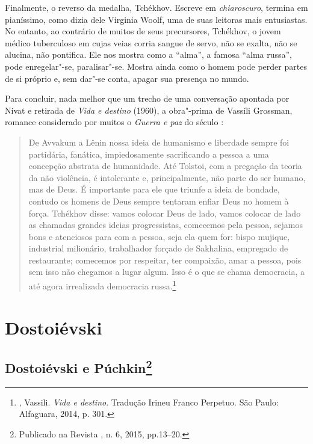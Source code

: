 Finalmente, o reverso da medalha, Tchékhov. Escreve em \emph{chiaroscuro}, termina em pianíssimo, como dizia dele Virginia
Woolf, uma de suas leitoras mais entusiastas. No entanto, ao contrário de muitos de seus precursores, Tchékhov, o jovem médico tuberculoso em cujas veias corria sangue de servo, não se exalta, não se alucina, não pontifica. Ele nos mostra como a ``alma'', a famosa ``alma russa'', pode enregelar"-se, paralisar"-se. Mostra ainda como o homem pode perder partes de si próprio e, sem dar"-se conta, apagar sua presença no mundo.

Para concluir, nada melhor que um trecho de uma conversação apontada por Nivat e retirada de \emph{Vida e destino} (1960), a obra"-prima de Vassíli Grossman, romance considerado por muitos o \emph{Guerra e paz} do século :

\begin{quotation}
De Avvakum a Lênin nossa ideia de humanismo e liberdade sempre foi partidária, fanática, impiedosamente sacrificando a pessoa a uma concepção abstrata de humanidade. Até Tolstoi, com a pregação da teoria da não violência, é intolerante e, principalmente, não parte do ser humano, mas de Deus. É importante para ele que triunfe a ideia de bondade, contudo os homens de Deus sempre tentaram enfiar Deus no homem à força. Tchékhov disse: vamos colocar Deus de lado, vamos colocar de
lado as chamadas grandes ideias progressistas, comecemos pela pessoa, sejamos bons e atenciosos para com a pessoa, seja ela quem for: bispo mujique, industrial milionário, trabalhador forçado de Sakhalina, empregado de restaurante; comecemos por respeitar, ter compaixão, amar a pessoa, pois sem isso não chegamos a lugar algum. Isso é o que se chama democracia, a até agora irrealizada democracia russa.\footnote{, Vassili. \emph{Vida e destino}. Tradução Irineu Franco Perpetuo. São Paulo: Alfaguara, 2014, p. 301.}
\end{quotation}


\part{Dostoiévski}

\chapter{Dostoiévski e Púchkin\footnote{Publicado na Revista {}, n. 6, 2015, pp.13--20.}}

